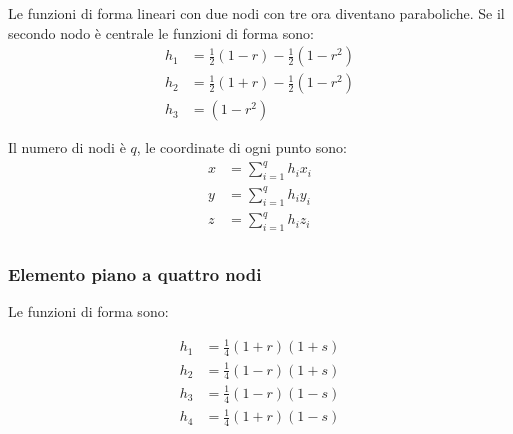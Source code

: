 Le funzioni di forma lineari con due nodi con tre ora diventano paraboliche. Se il secondo nodo è centrale le funzioni di forma sono:
\begin{align*}
    h_1&=\frac{1}{2}(1-r)-\frac{1}{2}(1-r^2)\\
    h_2&=\frac{1}{2}(1+r)-\frac{1}{2}(1-r^2)\\
    h_3&= (1-r^2)
\end{align*}

Il numero di nodi è $q$, le coordinate di ogni punto sono:
\begin{align*}
    x&=\sum^q_{i=1}h_ix_i\\
      y&=\sum^q_{i=1}h_iy_i\\
        z&=\sum^q_{i=1}h_iz_i\\
\end{align*}

\subsubsection*{Elemento piano a quattro nodi}


Le funzioni di forma sono:

\begin{align*}
    h_1&=\frac{1}{4}(1+r)(1+s)\\
    h_2&=\frac{1}{4}(1-r)(1+s)\\
    h_3&=\frac{1}{4}(1-r)(1-s)\\
    h_4&=\frac{1}{4}(1+r)(1-s)\\
\end{align*}

